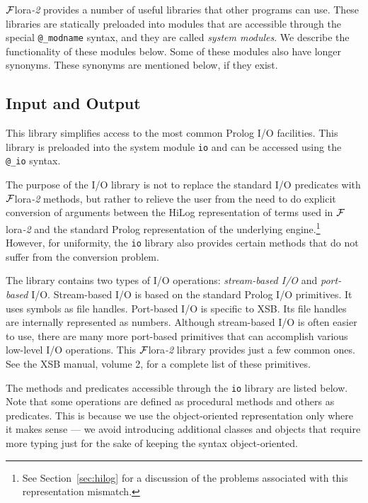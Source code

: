 \documentclass[11pt]{article}
\newcommand{\FLORA}{{\mbox{\sc ${\cal F}${lora}\rm\emph{-2}}}\xspace}
\begin{document}
\FLORA provides a number of useful libraries that other programs can use.
These libraries are statically preloaded into modules that are accessible
through the special {\tt @\_modname} syntax, and they are called
\emph{system modules}.  We describe the functionality of these modules
below. Some of these modules also have longer synonyms.
These synonyms are mentioned below, if they exist.

\subsection{Input and Output}

This library simplifies access to the most common Prolog I/O facilities.
This library is preloaded into the system module {\tt io} and
can be accessed using the {\tt @\_io} syntax.

The purpose of the I/O library is not to replace the standard I/O predicates
with \FLORA methods, but rather to relieve the user from the need to do
explicit conversion of arguments between the HiLog representation of terms
used in \FLORA and the standard Prolog representation of the underlying
engine.\footnote{
  See Section~\ref{sec:hilog} for a discussion of the problems associated
  with this representation mismatch.
  }
However, for uniformity, the {\tt io} library also provides certain methods
that do not suffer from the conversion problem.

The library contains two types of I/O operations: \emph{stream-based I/O}
and \emph{port-based} I/O.  Stream-based I/O is based on the standard Prolog
I/O primitives. It uses symbols as file handles. Port-based I/O is specific
to XSB. Its file handles are internally represented as numbers. Although
stream-based I/O is often easier to use, there are many more port-based
primitives that can accomplish various low-level I/O operations. This
\FLORA library provides just a few common ones. See the XSB manual, volume
2, for a complete list of these primitives.

The methods and predicates accessible through the {\tt io} library are
listed below.  Note that some operations are defined as procedural methods
and others as predicates. This is because we use the object-oriented
representation only where it makes sense --- we avoid introducing
additional classes and objects that require more typing just for the sake
of keeping the syntax object-oriented.
\end{document}
